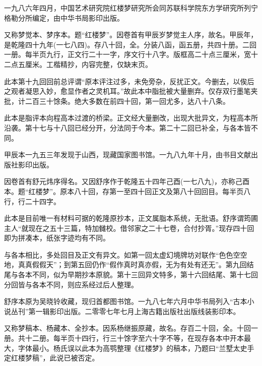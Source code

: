 一九八六年四月，中国艺术研究院红楼梦研究所会同苏联科学院东方学研究所列宁格勒分所编定，由中华书局影印出版。

{}

又称梦觉本、梦序本。题“红楼梦”。因卷首有甲辰岁梦觉主人序，故名。甲辰年，是乾隆四十九年(一七八四)。存八十回，全。分装八函，函五册，共四十册。二回一册。每半页九行，正文行二十一字，序文行十八字。版框高二十点三厘米，宽十二点五厘米。工楷精抄，内容完整，仅缺末页。

此本第十九回回前总评谓“原本评注过多，未免旁杂，反扰正文。今删去，以俟后之观者凝思入妙，愈显作者之灵机耳。”故此本中脂批被大量删弃。仅存双行墨笔夹批，计二百三十馀条。绝大多数在前四十回，第一回尤多，达八十八条。

此本是脂评本向程高本过渡的桥梁。正文经大量删改，出现大批异文，为程高本所沿袭。第十七与十八回已经分开，分法同于今本。第二十二回已补全，与各本皆不同。

甲辰本一九五三年发现于山西，现藏国家图书馆。一九八九年十月，由书目文献出版社影印出版。

{}

因卷首有舒元炜序得名。又因舒序作于乾隆五十四年己酉(一七八九)，亦称己酉本。题“红楼梦”。原本八十回，存第一至四十回正文及第八十回回目。每半页八行，行二十四字。

此本是目前唯一有材料可据的乾隆原抄本，正文属脂本系统，无批语。舒序谓筠圃主人“就现在之五十三篇，特加雠校。借邻家之二十七卷，合付抄胥。”现存四十回即为拼凑本，纸张字迹均有不同。

与各本相比，多处回目及正文有异文。如第一回太虚幻境牌坊对联作“色色空空地，真真假假天”；到第五回仍作“假作真时真亦假，无为有处有还无”。第九回结尾与各本不同，似为早期抄本原貌。第十三回异文特多，第十六回结尾、第十七回分回皆与各本不同，则应系经过后人整理。

舒序本原为吴晓铃收藏，现归首都图书馆。一九八七年六月中华书局列入“古本小说丛刊”第一辑影印出版。二零零七年七月上海古籍出版社出版线装影印本。

{}

又称梦稿本、杨藏本、全抄本。因系杨继振原藏，故名。存百二十回，全。十回一册。共十二册。每半页十四行，行三十馀字至六十字不等，在现存各本中开本最大，字体最小。杨氏误以此本为高鹗整理《红楼梦》的稿本，乃题曰“兰墅太史手定红楼梦稿”，此说已被否定。

